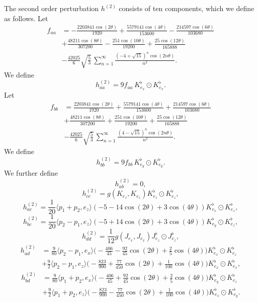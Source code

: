 \documentclass[11pt]{amsart}
\theoremstyle{definition}
\begin{document}
The second order perturbation $h^{(2)}$ consists of ten components, which we define as follows. Let
\begin{align*} 
f_{aa} 
&= -\frac{2203841 \cos(2\theta )}{1920}+\frac{5579141 \cos(4\theta )}{153600}-\frac{214597 \cos(6\theta)}{103680} \\ 
&+\frac{48211 \cos(8 \theta )}{307200}-\frac{251 \cos(10\theta)}{19200}+\frac{25 \cos(12\theta)}{165888} \\ 
&-\frac{42025}{6} \sqrt{\frac{5}{3}} \, \sum_{n=1}^\infty \frac{(-4+\sqrt{15})^n\cos(2n\theta)}{n^2}. 
\end{align*}
We define
\[h^{(2)}_{aa}=9 f_{aa}\, K^\flat_{e_x}\odot K^\flat_{e_x}.\] 
Let
\begin{align*}
f_{bb} 
&= \frac{2203841 \cos(2\theta )}{1920}+\frac{5579141 \cos(4\theta )}{153600}+\frac{214597 \cos(6\theta)}{103680} \\
&+\frac{48211 \cos(8\theta)}{307200}+\frac{251 \cos(10\theta)}{19200}+\frac{25 \cos(12\theta)}{165888} \\
&-\frac{42025}{6} \sqrt{\frac{5}{3}} \, \sum_{n=1}^\infty \frac{(4-\sqrt{15})^n \cos(2n\theta)}{n^2}.
\end{align*}
We define
\[h^{(2)}_{bb}=9 f_{bb}\, K^\flat_{e_y}\odot K^\flat_{e_y}.\] 
We further define
\[h^{(2)}_{ab}= 0,\] 
\[h^{(2)}_{cc}= g(K_{e_z},K_{e_z}) K^\flat_{e_z}\odot K^\flat_{e_z},\]
\[h^{(2)}_{ac}=\frac{1}{20}\langle p_1+p_2,e_z  \rangle(-5-14\cos(2\theta)+3\cos(4\theta))K^\flat_{e_x}\odot K^\flat_{e_z},\]
\[h^{(2)}_{bc}=\frac{1}{20}\langle p_2-p_1,e_z \rangle(-5+14\cos(2\theta)+3\cos(4\theta))K^\flat_{e_y}\odot K^\flat_{e_z},\] 
\[h^{(2)}_{dd}=\frac{1}{12} g(J_{e_x},J_{e_x}) J^\flat_{e_z}\odot J^\flat_{e_z},\] 
\begin{align*}
h^{(2)}_{ad} 
&= \frac{9}{80}\langle p_2-p_1,e_x \rangle \Big ( -\frac{406}{45} -\frac{92}{45} \cos (2 \theta )+\frac{2}{5} \cos (4 \theta ) \Big ) K^\flat_{e_x}\odot K^\flat_{e_z} \\
&+\frac{9}{2}\langle p_2-p_1,e_z  \rangle \Big ( -\frac{823}{900}+ \frac{77}{450} \cos (2 \theta )+\frac{1}{100} \cos (4 \theta ) \Big ) K^\flat_{e_x}\odot K^\flat_{e_x},
\end{align*}
\begin{align*}
h^{(2)}_{bd}
&= \frac{9}{80}\langle p_1+p_2,e_x \rangle \Big ( -\frac{406}{45}+\frac{92}{45} \cos (2 \theta )+\frac{2}{5} \cos (4 \theta ) \Big ) K^\flat_{e_y}\odot K^\flat_{e_z}\\
&+\frac{9}{2}\langle p_1+p_2,e_z \rangle \Big ( -\frac{823}{900} -\frac{77}{450} \cos (2 \theta )+\frac{1}{100} \cos (4 \theta ) \Big ) K^\flat_{e_x}\odot K^\flat_{e_y}.
\end{align*}
\end{document}
